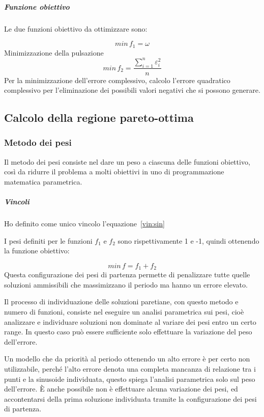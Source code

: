 \documentclass[a4paper,12pt]{report}
\begin{document}
\subparagraph{Funzione obiettivo}
Le due funzioni obiettivo da ottimizzare sono:

\begin{equation}
\label{fo:periodo}
min \, f_1 = \omega
\end{equation}
Minimizzazione della pulsazione
\begin{equation}
\label{fo:errore}
min \, f_2 = \frac{\sum_{i=1}^n \varepsilon_i^2}{n}
\end{equation}
Per la minimizzazione dell'errore complessivo, calcolo l'errore quadratico complessivo per l'eliminazione dei possibili valori negativi che si possono generare.




\subsection{Calcolo della regione pareto-ottima}

\subsubsection{Metodo dei pesi}

Il metodo dei pesi consiste nel dare un peso a ciascuna delle funzioni obiettivo, così da ridurre il problema a molti obiettivi in uno di programmazione matematica parametrica.

\subparagraph{Vincoli}
Ho definito come unico vincolo l'equazione~\eqref{vin:sin}

I pesi definiti per le funzioni $ f_1 $ e $ f_2 $ sono rispettivamente 1 e -1, quindi ottenendo la funzione obiettivo:

\begin{equation}
min \, f = f_1 + f_2
\end{equation}
Questa configurazione dei pesi di partenza permette di penalizzare tutte quelle soluzioni ammissibili che massimizzano il periodo ma hanno un errore elevato.

Il processo di individuazione delle soluzioni paretiane, con questo metodo e numero di funzioni, consiste nel eseguire un analisi parametrica sui pesi, cioè analizzare e individuare soluzioni non dominate al variare dei pesi entro un certo range. In questo caso può essere sufficiente solo effettuare la variazione del peso dell'errore.

Un modello che da priorità al periodo ottenendo un alto errore è per certo non utilizzabile, perché l'alto errore denota una completa mancanza di relazione tra i punti e la sinusoide individuata, questo spiega l'analisi parametrica solo sul peso dell'errore. È anche possibile non è effettuare alcuna variazione dei pesi, ed accontentarsi della prima soluzione individuata tramite la configurazione dei pesi di partenza.
\end{document}
